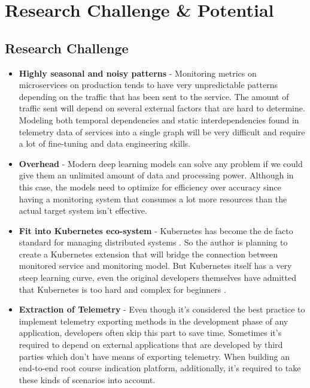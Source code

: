 \section{Research Challenge \& Potential}


\subsection{Research Challenge}

\begin{itemize}[leftmargin=*] 
    \item \textbf{Highly seasonal and noisy patterns} - Monitoring metrics on microservices on production tends to have very unpredictable patterns depending on the traffic that has been sent to the service. The amount of traffic sent will depend on several external factors that are hard to determine. Modeling both temporal dependencies and static interdependencies found in telemetry data of services into a single graph will be very difficult and require a lot of fine-tuning and data engineering skills.
    \item \textbf{Overhead} - Modern deep learning models can solve any problem if we could give them an unlimited amount of data and processing power. Although in this case, the models need to optimize for efficiency over accuracy since having a monitoring system that consumes a lot more resources than the actual target system isn't effective.
    \item \textbf{Fit into Kubernetes eco-system} - Kubernetes has become the de facto standard for managing distributed systems \citep{WhatisCo78:online}. So the author is planning to create a Kubernetes extension that will bridge the connection between monitored service and monitoring model. But Kubernetes itself has a very steep learning curve, even the original developers themselves have admitted that Kubernetes is too hard and complex for beginners \citep{Googlead4:online}.
    \item \textbf{Extraction of Telemetry} - Even though it's considered the best practice to implement telemetry exporting methods in the development phase of any application, developers often skip this part to save time. Sometimes it's required to depend on external applications that are developed by third parties which don't have means of exporting telemetry. When building an end-to-end root course indication platform, additionally, it's required to take these kinds of scenarios into account.
\end{itemize}


